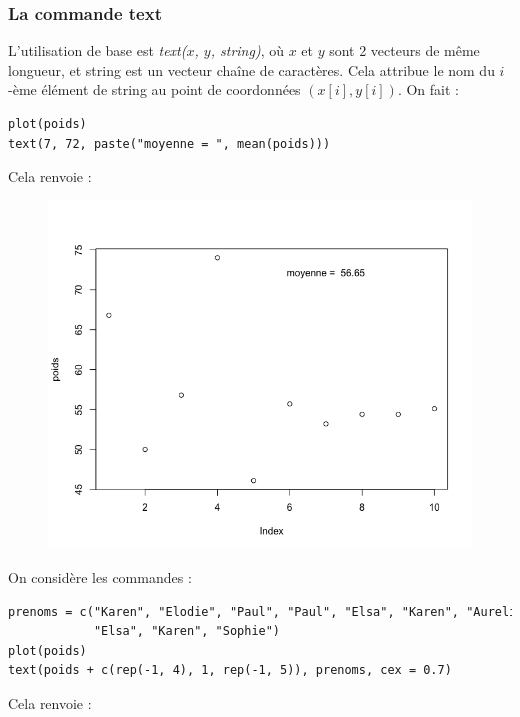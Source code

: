 \subsubsection{La commande text}
L'utilisation de base est \textit{text($x$, $y$, string)}, où $x$ et $y$ sont 2 vecteurs de même longueur, et string est un vecteur chaîne de caractères.
Cela attribue le nom du $i$-ème élément de string au point de coordonnées $(x[i], y[i])$.\newline
On fait :
\begin{lstlisting}[language=html]
plot(poids)
text(7, 72, paste("moyenne = ", mean(poids)))
\end{lstlisting}
Cela renvoie :
\begin{figure}[H]\begin{center}\includegraphics[scale=0.4]{ilu/gra56.png}\end{center}\end{figure}
On considère les commandes :
\begin{lstlisting}[language=html]
prenoms = c("Karen", "Elodie", "Paul", "Paul", "Elsa", "Karen", "Aurelie",
            "Elsa", "Karen", "Sophie")
plot(poids)
text(poids + c(rep(-1, 4), 1, rep(-1, 5)), prenoms, cex = 0.7)
\end{lstlisting}
Cela renvoie :
